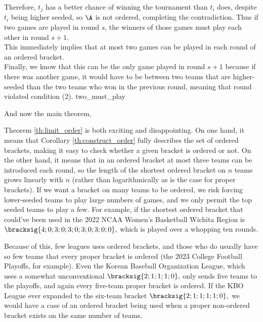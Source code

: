 {{    Therefore, $t_j$ has a better chance of winning the tournament than $t_i$ does, despite $t_i$ being higher seeded, so $\A$ is not ordered, completing the contradiction. Thus if two games are played in round $s$, the winners of those games must play each other in round $s+1.$\\

    This immediately implies that at most two games can be played in each round of an ordered bracket.\\
    
    Finally, we know that this can be the only game played in round $s+1$ because if there was another game, it would have to be between two teams that are higher-seeded than the two teams who won in the previous round, meaning that round violated condition (2).
}{two_must_play}

And now the main theorem,


Theorem \ref{th:limit_order} is both exciting and disappointing. On one hand, it means that Corollary \ref{th:construct_order} fully describes the set of ordered brackets, making it easy to check whether a given bracket is ordered or not. On the other hand, it means that in an ordered bracket at most three teams can be introduced each round, so the length of the shortest ordered bracket on $n$ teams grows linearly with $n$ (rather than logarithmically as is the case for proper brackets). If we want a bracket on many teams to be ordered, we risk forcing lower-seeded teams to play large numbers of games, and we only permit the top seeded teams to play a few. For example, if the shortest ordered bracket that could've been used in the 2022 NCAA Women's Basketball Wichita Region is $\bracksig{4; 0; 3; 0; 3; 0; 3; 0; 3; 0; 0},$ which is played over a whopping ten rounds.


Because of this, few leagues uses ordered brackets, and those who do usually have so few teams that every proper bracket is ordered (the 2023 College Football Playoffs, for example). Even the Korean Baseball Organization League, which uses a somewhat unconventional $\bracksig{2; 1; 1; 1; 0},$ only sends five teams to the playoffs, and again every five-team proper bracket is ordered. If the KBO League ever expanded to the six-team bracket $\bracksig{2; 1; 1; 1; 1; 0},$ we would have a case of an ordered bracket being used when a proper non-ordered bracket exists on the same number of teams.
}